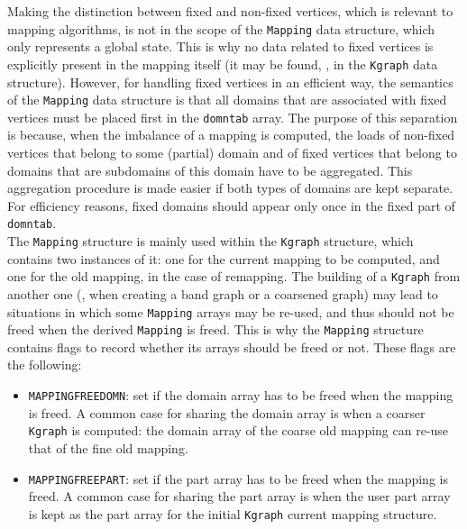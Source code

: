 Making the distinction between fixed and non-fixed vertices, which is
relevant to mapping algorithms, is not in the scope of the
\texttt{Mapping} data structure, which only represents a global
state. This is why no data related to fixed vertices is explicitly
present in the mapping itself (it may be found, \eg, in the
\texttt{Kgraph} data structure).
However, for handling fixed vertices in an efficient way, the
semantics of the \texttt{Mapping} data structure is that all domains
that are associated with fixed vertices must be placed first in the
\texttt{domntab} array. The purpose of this separation is because,
when the imbalance of a mapping is computed, the loads of non-fixed
vertices that belong to some (partial) domain and of fixed vertices
that belong to domains that are subdomains of this domain have to be
aggregated. This aggregation procedure is made easier if both types of
domains are kept separate. For efficiency reasons, fixed domains
should appear only once in the fixed part of \texttt{domntab}.
\\

The \texttt{Mapping} structure is mainly used within the
\texttt{Kgraph} structure, which contains two instances of it: one for
the current mapping to be computed, and one for the old mapping, in
the case of remapping. The building of a \texttt{Kgraph} from another
one (\eg, when creating a band graph or a coarsened graph) may lead to
situations in which some \texttt{Mapping} arrays may be re-used, and
thus should not be freed when the derived \texttt{Mapping} is
freed. This is why the \texttt{Mapping} structure contains flags to
record whether its arrays should be freed or not. These flags are the
following:
\begin{itemize}
\item
\texttt{MAPPINGFREEDOMN}: set if the domain array has to be freed when
the mapping is freed. A common case for sharing the domain array is
when a coarser \texttt{Kgraph} is computed: the domain array of the
coarse old mapping can re-use that of the fine old mapping.
\item
\texttt{MAPPINGFREEPART}: set if the part array has to be freed when
the mapping is freed. A common case for sharing the part array is when
the user part array is kept as the part array for the initial
\texttt{Kgraph} current mapping structure.
\end{itemize}

